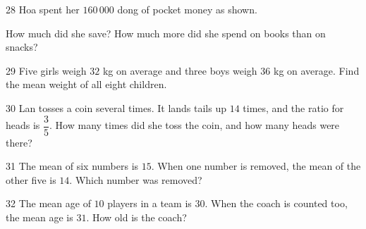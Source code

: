\gap
\needspace{7.5cm}
\begin{probbox}{28}{\relax}
Hoa spent her $160\,000$ dong of pocket money as shown.
\begin{center}
\end{center}
 How much did she save? \quad {} How much more did she spend on books than on snacks?
\end{probbox}
\gap
\begin{probbox}{29}{\relax}
Five girls weigh $32$ kg on average and three boys weigh $36$ kg on average. Find the mean weight of all eight children.
\end{probbox}
\gap
\begin{probbox}{30}{\relax}
Lan tosses a coin several times. It lands tails up $14$ times, and the ratio for heads is $\dfrac35$. How many times did she toss the coin, and how many heads were there?
\end{probbox}
\begin{probbox}{31}{}
The mean of six numbers is $15$. When one number is removed, the mean of the other five is $14$. Which number was removed?
\end{probbox}
\gap
\begin{probbox}{32}{}
The mean age of $10$ players in a team is $30$. When the coach is counted too, the mean age is $31$. How old is the coach?
\end{probbox}
